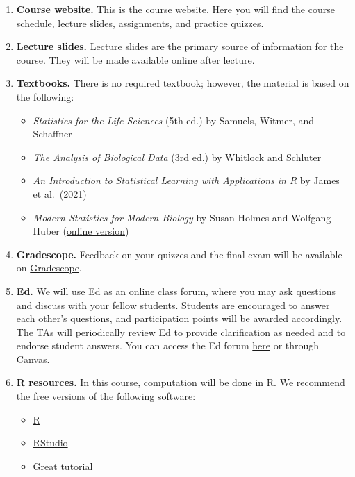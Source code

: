 \documentclass[
  letterpaper,
  DIV=11,
  numbers=noendperiod]{scrreprt}
\providecommand{\tightlist}{%
  \setlength{\itemsep}{0pt}\setlength{\parskip}{0pt}}
\begin{document}
\begin{enumerate}
\def\labelenumi{\arabic{enumi}.}
\item
  \textbf{Course website.} This is the course website. Here you will
  find the course schedule, lecture slides, assignments, and practice
  quizzes.
\item
  \textbf{Lecture slides.} Lecture slides are the primary source of
  information for the course. They will be made available online after
  lecture.
\item
  \textbf{Textbooks.} There is no required textbook; however, the
  material is based on the following:

  \begin{itemize}
  \tightlist
  \item
    \emph{Statistics for the Life Sciences} (5th ed.) by Samuels,
    Witmer, and Schaffner\\
  \item
    \emph{The Analysis of Biological Data} (3rd ed.) by Whitlock and
    Schluter\\
  \item
    \emph{An Introduction to Statistical Learning with Applications in
    R} by James et al.~(2021)\\
  \item
    \emph{Modern Statistics for Modern Biology} by Susan Holmes and
    Wolfgang Huber
    (\href{https://web.stanford.edu/class/bios221/book/}{online
    version})
  \end{itemize}
\item
  \textbf{Gradescope.} Feedback on your quizzes and the final exam will
  be available on
  \href{https://canvas.stanford.edu/courses/224513/external_tools/74302}{Gradescope}.
\item
  \textbf{Ed.} We will use Ed as an online class forum, where you may
  ask questions and discuss with your fellow students. Students are
  encouraged to answer each other's questions, and participation points
  will be awarded accordingly. The TAs will periodically review Ed to
  provide clarification as needed and to endorse student answers. You
  can access the Ed forum
  \href{https://edstem.org/us/courses/96989/discussion}{here} or through
  Canvas.
\item
  \textbf{R resources.} In this course, computation will be done in R.
  We recommend the free versions of the following software:

  \begin{itemize}
  \tightlist
  \item
    \href{https://cloud.r-project.org/}{R}
  \item
    \href{https://posit.co/download/rstudio-desktop/}{RStudio}
  \item
    \href{https://r4ds.hadley.nz/}{Great tutorial}
  \end{itemize}


\end{enumerate}
\end{document}
